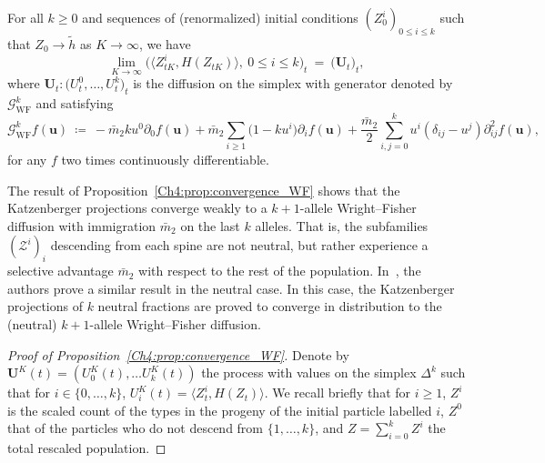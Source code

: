 \begin{refsegment}
\begin{prop}\label{Ch4:prop:convergence_WF}
  For all $k\geq 0$ and sequences of  (renormalized) initial conditions $(Z^i_0)_{0\leq i\leq k}$ such that $ Z_0\to \tilde h$ as $K\to\infty$, we have
   \[
 \lim_{K\to\infty} \Big(\big\langle  Z^i_{t K}, H(Z_{t K})\big\rangle,\ 0\leq i\leq k \Big)_t  \ =\ \big(\bm U_t \big)_t,
 \]
 where $\bm U_t:\big(U^0_t,\ldots, U^k_t \big)_t$ is the diffusion on the simplex with generator denoted by $\mathcal{G}^k_{\mathrm{WF}}$ and satisfying
 \begin{equation}\label{Ch4:eq:WF_diffusion}
\mathcal{G}^k_{\mathrm{WF}}f(\bm u) \ \coloneqq\ - \bar m_2 k u^0\partial_0 f(\bm u)+  \bar m_2\sum_{i\geq 1}\big( 1  -  k u^i  \big)\partial_i f(\bm u)  + \frac{\bar m_2}{2}\sum_{i,j=0}^{k}  u^i(\delta_{ij}-u^j)\partial^2_{ij}f(\bm u),
 \end{equation}
 for any $f$ two times continuously differentiable.
\end{prop}
\begin{rem}
  The result of Proposition~\ref{Ch4:prop:convergence_WF} shows that the Katzenberger projections converge weakly to a $k+1$-allele Wright--Fisher diffusion with immigration $\bar m_2$ on the last $k$ alleles. That is, the subfamilies $(\mathcal Z^i)_i$ descending from each spine are not neutral, but rather experience a selective advantage $\bar m_2$ with respect to the rest of the population.
In~\cite{Julie_Zsofia}, the authors prove a similar result in the neutral case. In this case, the Katzenberger projections of $k$ neutral fractions are proved to converge in distribution to the (neutral) $k+1$-allele Wright--Fisher diffusion.
\end{rem}
\begin{proof}[Proof of Proposition~\ref{Ch4:prop:convergence_WF}]
Denote by $\bm U^K(t)=( U^{K}_0(t),\ldots  U^{K}_k(t))$ the process with values on the simplex $\Delta^{k}$ such that for $i\in \{0,\ldots,k\}$, $ U^{K}_i(t)= \langle  Z^i_t, H( Z_t)\rangle$. We recall briefly that for $i\geq 1$, $Z^i$ is the scaled count of the types in the progeny of the initial particle labelled $i$, $ Z^0$ that of the particles who do not descend from $\{1,\ldots, k\}$, and $Z=\sum_{i=0}^k  Z^i$ the total rescaled population.


\end{proof}
\end{refsegment}

